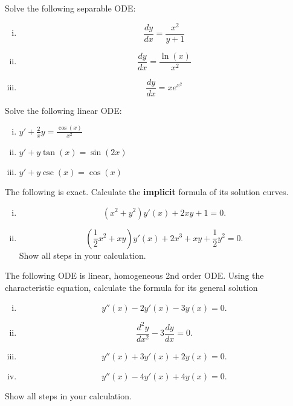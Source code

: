 \documentclass[10pt,twoside,sfsidenotes]{tufte-handout}
\begin{document}
  \begin{question}
    Solve the following separable ODE:
    \begin{enumerate}[(i)]
      \item \[\frac{dy}{dx} = \frac{x^{2}}{y+1}\]
      \item \[\frac{dy}{dx} = \frac{\ln(x)}{x^{2}}\]
      \item \[\frac{dy}{dx} = x e^{x^{2}}\]
    \end{enumerate}
  \end{question}



  \begin{question}
    Solve the following linear ODE:
    \begin{enumerate}[(i)]
        \item \(y' + \frac{2}{x}y = \frac{\cos(x)}{x^2}\)
        \item \(y' + y \tan(x) = \sin(2x)\)
        \item \(y' + y \csc(x) = \cos(x)\)
    \end{enumerate}
  \end{question}



  \begin{question} %
    The following \ode{} is exact.
    Calculate the \textbf{implicit} formula of its solution curves.
    \begin{enumerate}[(i)]
      \item \[(x^{2} + y^{2})y'(x) + 2xy+1  = 0.\]
      \item \[ \left( \frac{1}{2}x^{2} + xy \right) y'(x) + 2x^{3} + xy + \frac{1}{2}y^{2} = 0.\]
    Show all steps in your calculation.
    \end{enumerate}
  \end{question}
 


  \begin{question} %
    The following ODE is linear, homogeneous 2nd order ODE. Using the characteristic equation, calculate the formula for its general solution
    \begin{enumerate}[(i)]
      \item \[y''(x) - 2 y'(x) - 3 y(x) = 0.\]
      \item \[\frac{d^{2}y}{dx^{2}} - 3 \frac{dy}{dx} = 0.\]
      \item \[y''(x) + 3 y'(x) + 2 y(x) = 0.\]
      \item \[y''(x) - 4 y'(x) + 4 y(x) = 0.\] 
    \end{enumerate}
    Show all steps in your calculation.
  \end{question}
\end{document}

